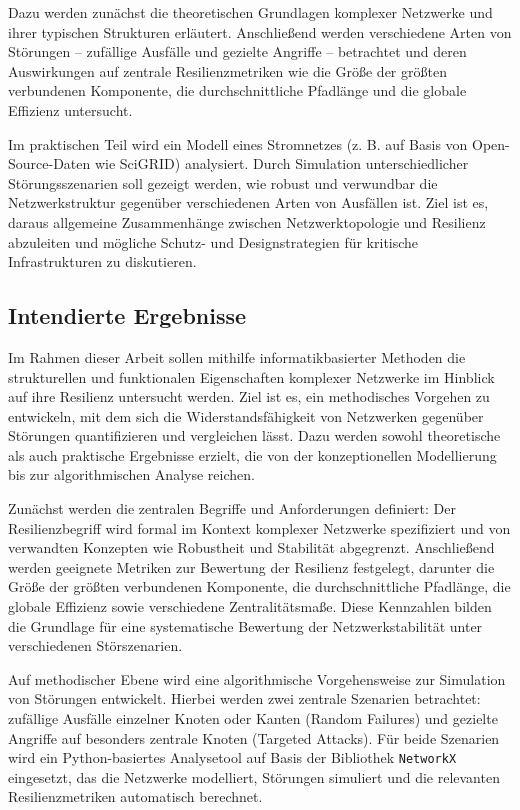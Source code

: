 \documentclass[12pt]{article} %
\begin{document}
Dazu werden zunächst die theoretischen Grundlagen komplexer Netzwerke und ihrer typischen Strukturen erläutert. Anschließend werden verschiedene Arten von Störungen – zufällige Ausfälle und gezielte Angriffe – betrachtet und deren Auswirkungen auf zentrale Resilienzmetriken wie die Größe der größten verbundenen Komponente, die durchschnittliche Pfadlänge und die globale Effizienz untersucht.

Im praktischen Teil wird ein Modell eines Stromnetzes (z. B. auf Basis von Open-Source-Daten wie SciGRID) analysiert. Durch Simulation unterschiedlicher Störungsszenarien soll gezeigt werden, wie robust und verwundbar die Netzwerkstruktur gegenüber verschiedenen Arten von Ausfällen ist. Ziel ist es, daraus allgemeine Zusammenhänge zwischen Netzwerktopologie und Resilienz abzuleiten und mögliche Schutz- und Designstrategien für kritische Infrastrukturen zu diskutieren.

\subsection{Intendierte Ergebnisse}
Im Rahmen dieser Arbeit sollen mithilfe informatikbasierter Methoden die strukturellen und funktionalen Eigenschaften komplexer Netzwerke im Hinblick auf ihre Resilienz untersucht werden. Ziel ist es, ein methodisches Vorgehen zu entwickeln, mit dem sich die Widerstandsfähigkeit von Netzwerken gegenüber Störungen quantifizieren und vergleichen lässt. Dazu werden sowohl theoretische als auch praktische Ergebnisse erzielt, die von der konzeptionellen Modellierung bis zur algorithmischen Analyse reichen.

Zunächst werden die zentralen Begriffe und Anforderungen definiert: Der Resilienzbegriff wird formal im Kontext komplexer Netzwerke spezifiziert und von verwandten Konzepten wie Robustheit und Stabilität abgegrenzt. Anschließend werden geeignete Metriken zur Bewertung der Resilienz festgelegt, darunter die Größe der größten verbundenen Komponente, die durchschnittliche Pfadlänge, die globale Effizienz sowie verschiedene Zentralitätsmaße. Diese Kennzahlen bilden die Grundlage für eine systematische Bewertung der Netzwerkstabilität unter verschiedenen Störszenarien.

Auf methodischer Ebene wird eine algorithmische Vorgehensweise zur Simulation von Störungen entwickelt. Hierbei werden zwei zentrale Szenarien betrachtet: zufällige Ausfälle einzelner Knoten oder Kanten (Random Failures) und gezielte Angriffe auf besonders zentrale Knoten (Targeted Attacks). Für beide Szenarien wird ein Python-basiertes Analysetool auf Basis der Bibliothek \texttt{NetworkX} eingesetzt, das die Netzwerke modelliert, Störungen simuliert und die relevanten Resilienzmetriken automatisch berechnet.
\end{document}
